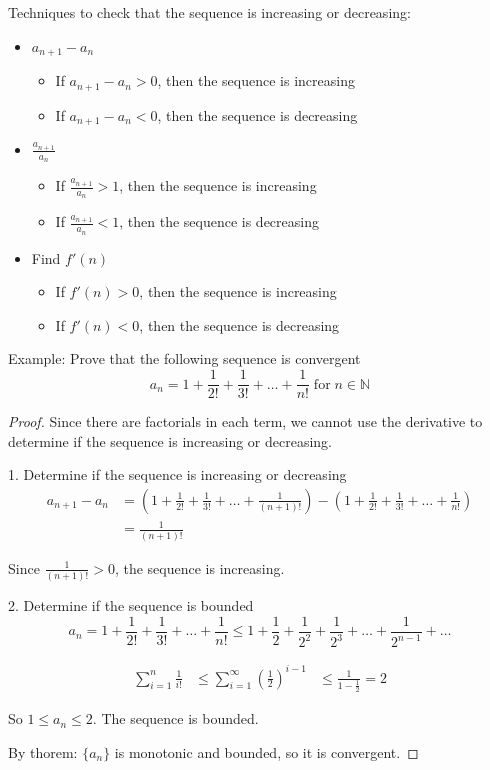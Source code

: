 \begin{remark}
  Techniques to check that the sequence is increasing or decreasing:
  \begin{itemize}
    \item \(a_{n + 1} - a_{n}\) \begin{itemize}
      \item If \(a_{n + 1} - a_{n} > 0\), then the sequence is increasing
      \item If \(a_{n + 1} - a_{n} < 0\), then the sequence is decreasing
    \end{itemize}
    \item \(\frac{a_{n + 1}}{a_n}\) \begin{itemize}
      \item If \(\frac{a_{n + 1}}{a_n} > 1\), then the sequence is increasing
      \item If \(\frac{a_{n + 1}}{a_n} < 1\), then the sequence is decreasing
    \end{itemize}
    \item Find $f'(n)$ \begin{itemize}
      \item If $f'(n) > 0$, then the sequence is increasing
      \item If $f'(n) < 0$, then the sequence is decreasing
    \end{itemize}
  \end{itemize}
\end{remark}

Example: Prove that the following sequence is convergent
\[
  a_{n} = 1 + \frac{1}{2!} + \frac{1}{3!} + \dots + \frac{1}{n!} \; \mathrm{for} \; n \in \mathbb{N}
\]

\begin{proof}
  Since there are factorials in each term, we cannot use the derivative to determine if the sequence is increasing or decreasing.

  1. Determine if the sequence is increasing or decreasing
  \[
    \begin{aligned}
      a_{n + 1} - a_{n} &= (1 + \frac{1}{2!} + \frac{1}{3!} + \dots + \frac{1}{(n + 1)!}) - (1 + \frac{1}{2!} + \frac{1}{3!} + \dots + \frac{1}{n!}) \\
      &= \frac{1}{(n + 1)!} 
    \end{aligned}
  \]

  Since \(\frac{1}{(n + 1)!} > 0\), the sequence is increasing.

  2. Determine if the sequence is bounded
  \[
    a_{n} = 1 + \frac{1}{2!} + \frac{1}{3!} + \dots + \frac{1}{n!} \le 1 + \frac{1}{2} + \frac{1}{2^2} + \frac{1}{2^3} + \dots + \frac{1}{2^{n - 1}} + \dots
  \]

  \[
    \begin{aligned}
      \sum_{i=1}^{n} \frac{1}{i!} &\le \sum_{i=1}^{\infty} (\frac{1}{2})^{i - 1}
      &\le \frac{1}{1 - \frac{1}{2}} = 2
    \end{aligned}
  \]

  So \(1 \le a_{n} \le 2\). The sequence is bounded.

  By thorem: \(\{a_n\}\) is monotonic and bounded, so it is convergent.
\end{proof}

